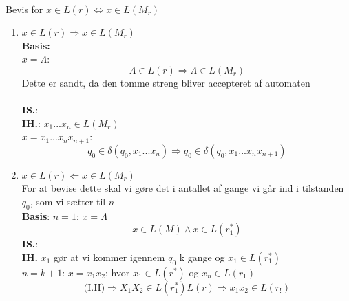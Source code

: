 \documentclass[a4, danish]{article}
\begin{document}
  \\ 
  Bevis for $x \in L(r) \Leftrightarrow x \in L(M_r)$
  \begin{enumerate}
  	\item $x \in L(r) \Rightarrow x \in L(M_r)$ \\
    \textbf{Basis:} \\
    $x=\Lambda$:
    \begin{equation*}
      \Lambda \in L(r) \Rightarrow \Lambda \in L(M_r)
    \end{equation*}
    Dette er sandt, da den tomme streng bliver accepteret af automaten \\ \ \\
    \textbf{IS.}: \\
    \textbf{IH.}: $x_1 ... x_n \in L(M_r)$\\
    $x=x_1...x_nx_{n+1}$:
    \begin{equation*}
      q_0 \in \delta(q_0, x_1 ... x_n) \Rightarrow q_0 \in \delta(q_0, x_1 ... x_nx_{n+1})
    \end{equation*}
    \item $x \in L(r) \Leftarrow x \in L(M_r)$ \\
    For at bevise dette skal vi gøre det i antallet af gange vi går ind i tilstanden $q_0$, som vi sætter til $n$ \\
    \textbf{Basis}:
    $n=1$: $x=\Lambda$
    \begin{equation*}
      x \in L(M) \land x \in L(r_1^*)
    \end{equation*}
    \textbf{IS.}: \\
    \textbf{IH.} $x_1$ gør at vi kommer igennem $q_0$ k gange og $x_1 \in L(r_1^*)$\\
    $n=k+1$: $x=x_1x_2$: hvor $x_1\in L(r^*)$ og $x_n \in L(r_1)$
    \begin{equation*}
      \text{(I.H)} \Rightarrow X_1X_2 \in L(r_1^*)L(r) \Rightarrow x_1x_2 \in L(r_!)
    \end{equation*}

  \end{enumerate}
\end{document}
